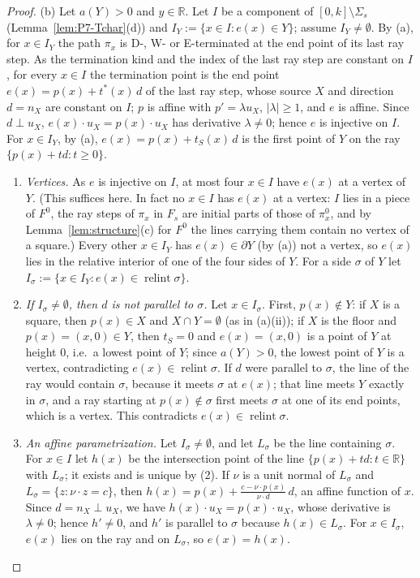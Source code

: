 \documentclass[11pt]{amsart}
\newcommand{\R}{\mathbb R}
\newcommand{\relint}{\operatorname{relint}}
\newcommand{\Fz}{F^{0}}
\newcommand{\Fs}{F_{s}}
\theoremstyle{definition}
\theoremstyle{remark}
\numberwithin{equation}{section}
\begin{document}
\begin{proof}
(b) Let $a(Y)>0$ and $y\in\R$. Let $I$ be a component of $[0,k]\setminus\Sigma_s$ (Lemma~\ref{lem:P7-Tchar}(d)) and $I_Y:=\{x\in I: e(x)\in Y\}$; assume $I_Y\ne\emptyset$. By (a), for $x\in I_Y$ the path $\pi_x$ is D-, W- or E-terminated at the end point of its last ray step. As the termination kind and the index of the last ray step are constant on $I$, for every $x\in I$ the termination point is the end point $e(x)=p(x)+t^*(x)\,d$ of the last ray step, whose source $X$ and direction $d=n_X$ are constant on $I$; $p$ is affine with $p'=\lambda u_X$, $|\lambda|\ge1$, and $e$ is affine. Since $d\perp u_X$, $e(x)\cdot u_X=p(x)\cdot u_X$ has derivative $\lambda\ne0$; hence $e$ is injective on $I$. For $x\in I_Y$, by (a), $e(x)=p(x)+t_S(x)\,d$ is the first point of $Y$ on the ray $\{p(x)+td:t\ge0\}$.
\begin{enumerate}[label=(\arabic*)]
\item \emph{Vertices.} As $e$ is injective on $I$, at most four $x\in I$ have $e(x)$ at a vertex of $Y$. (This suffices here. In fact no $x\in I$ has $e(x)$ at a vertex: $I$ lies in a piece of $\Fz$, the ray steps of $\pi_x$ in $\Fs$ are initial parts of those of $\pi^0_x$, and by Lemma~\ref{lem:structure}(c) for $\Fz$ the lines carrying them contain no vertex of a square.) Every other $x\in I_Y$ has $e(x)\in\partial Y$ (by (a)) not a vertex, so $e(x)$ lies in the relative interior of one of the four sides of $Y$. For a side $\sigma$ of $Y$ let $I_\sigma:=\{x\in I_Y: e(x)\in\relint\sigma\}$.
\item \emph{If $I_\sigma\ne\emptyset$, then $d$ is not parallel to $\sigma$.} Let $x\in I_\sigma$. First, $p(x)\notin Y$: if $X$ is a square, then $p(x)\in X$ and $X\cap Y=\emptyset$ (as in (a)(ii)); if $X$ is the floor and $p(x)=(x,0)\in Y$, then $t_S=0$ and $e(x)=(x,0)$ is a point of $Y$ at height $0$, i.e.\ a lowest point of $Y$; since $a(Y)>0$, the lowest point of $Y$ is a vertex, contradicting $e(x)\in\relint\sigma$. If $d$ were parallel to $\sigma$, the line of the ray would contain $\sigma$, because it meets $\sigma$ at $e(x)$; that line meets $Y$ exactly in $\sigma$, and a ray starting at $p(x)\notin\sigma$ first meets $\sigma$ at one of its end points, which is a vertex. This contradicts $e(x)\in\relint\sigma$.
\item \emph{An affine parametrization.} Let $I_\sigma\ne\emptyset$, and let $L_\sigma$ be the line containing $\sigma$. For $x\in I$ let $h(x)$ be the intersection point of the line $\{p(x)+td:t\in\R\}$ with $L_\sigma$; it exists and is unique by (2). If $\nu$ is a unit normal of $L_\sigma$ and $L_\sigma=\{z:\nu\cdot z=c\}$, then $h(x)=p(x)+\frac{c-\nu\cdot p(x)}{\nu\cdot d}\,d$, an affine function of $x$. Since $d=n_X\perp u_X$, we have $h(x)\cdot u_X=p(x)\cdot u_X$, whose derivative is $\lambda\ne0$; hence $h'\ne0$, and $h'$ is parallel to $\sigma$ because $h(x)\in L_\sigma$. For $x\in I_\sigma$, $e(x)$ lies on the ray and on $L_\sigma$, so $e(x)=h(x)$.

\end{enumerate}
\end{proof}
\end{document}
